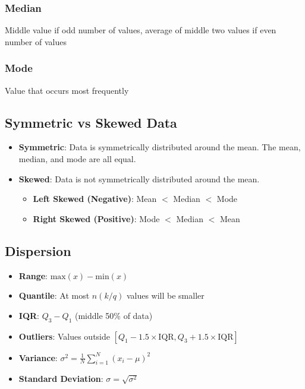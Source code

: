 \subsubsection*{Median}
Middle value if odd number of values, average of middle two values if even number of values

\subsubsection*{Mode}
Value that occurs most frequently

\subsection*{Symmetric vs Skewed Data}
\begin{itemize}[noitemsep]
    \item \textbf{Symmetric}: Data is symmetrically distributed around the mean. The mean, median, and mode are all equal.
    \item \textbf{Skewed}: Data is not symmetrically distributed around the mean.
    \begin{itemize}
        \item \textbf{Left Skewed (Negative)}: Mean $<$ Median $<$ Mode
        \item \textbf{Right Skewed (Positive)}: Mode $<$ Median $<$ Mean
    \end{itemize}
\end{itemize}

\subsection*{Dispersion}
\begin{itemize}[noitemsep]
    \item \textbf{Range}: $\text{max}(x) - \text{min}(x)$
    \item \textbf{Quantile}: At most $n(k/q)$ values will be smaller
    \item \textbf{IQR}: $Q_3 - Q_1$ (middle 50\% of data)
    \item \textbf{Outliers}: Values outside $[Q_1 - 1.5 \times \text{IQR}, Q_3 + 1.5 \times \text{IQR}]$
    \item \textbf{Variance}: $\sigma^2 = \frac{1}{N} \sum_{i=1}^{N} (x_i - \mu)^2$
    \item \textbf{Standard Deviation}: $\sigma = \sqrt{\sigma^2}$
\end{itemize}

